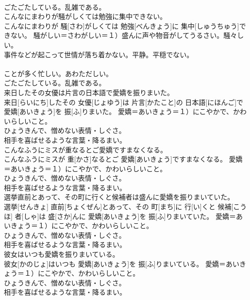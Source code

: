 \documentclass[8pt]{extreport}
\begin{document}
\begin{CJK}{UTF8}{min}
{\\	ごたごたしている。乱雑である。
\\	こんなにまわりが騒がしくては勉強に集中できない。	
\\	こんなにまわりが 騒[さわ]がしくては 勉強[べんきょう]に 集中[しゅうちゅう]できない。	騒がしい＝さわがしい＝１）盛んに声や物音がしてうるさい。騒々しい。 　　　　　　　　　　　
\\	事件などが起こって世情が落ち着かない。平静。平穏でない。 　　　　　　　　　　　
\\	ことが多く忙しい。あわただしい。 　　　　　　　　　　　
\\	ごたごたしている。乱雑である。
\\	来日したその女優は片言の日本語で愛嬌を振りまいた。	
\\	来日[らいにち]したその 女優[じょゆう]は 片言[かたこと]の 日本語[にほんご]で 愛嬌[あいきょう]を 振[ふ]りまいた。	愛嬌＝あいきょう＝１）にこやかで、かわいらしいこと。 　　　　　　　　　
\\	ひょうきんで、憎めない表情・しぐさ。 　　　　　　　　　
\\	相手を喜ばせるような言葉・降るまい。
\\	こんなふうにミスが重なるとご愛嬌ですまなくなる。	
\\	こんなふうにミスが 重[かさ]なるとご 愛嬌[あいきょう]ですまなくなる。	愛嬌＝あいきょう＝１）にこやかで、かわいらしいこと。 　　　　　　　　　
\\	ひょうきんで、憎めない表情・しぐさ。 　　　　　　　　　
\\	相手を喜ばせるような言葉・降るまい。
\\	選挙直前とあって、その町に行くと候補者は盛んに愛嬌を振りまいていた。	
\\	選挙[せんきょ] 直前[ちょくぜん]とあって、その 町[まち]に 行[い]くと 候補[こうほ] 者[しゃ]は 盛[さか]んに 愛嬌[あいきょう]を 振[ふ]りまいていた。	愛嬌＝あいきょう＝１）にこやかで、かわいらしいこと。 　　　　　　　　　
\\	ひょうきんで、憎めない表情・しぐさ。 　　　　　　　　　
\\	相手を喜ばせるような言葉・降るまい。
\\	彼女はいつも愛嬌を振りまいている。	
\\	彼女[かのじょ]はいつも 愛嬌[あいきょう]を 振[ふ]りまいている。	愛嬌＝あいきょう＝１）にこやかで、かわいらしいこと。 　　　　　　　　　
\\	ひょうきんで、憎めない表情・しぐさ。 　　　　　　　　　
\\	相手を喜ばせるような言葉・降るまい。
}
\end{CJK}
\end{document}
